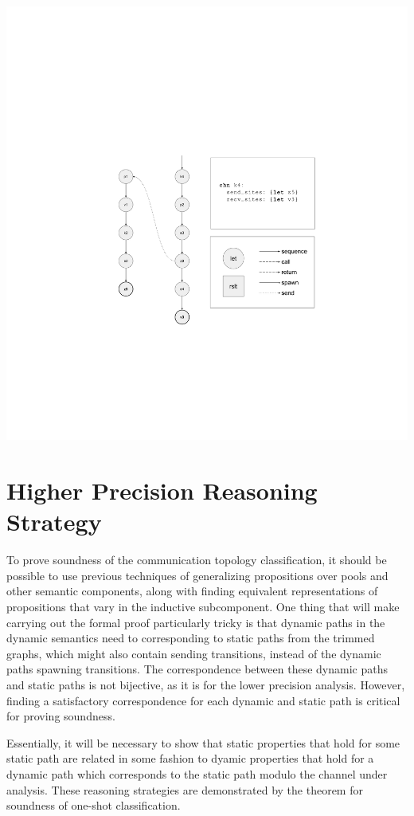 \documentclass[10pt]{article}
\begin{document}
\includegraphics[width=1.3\textwidth, left]{cml_graph_k4.pdf}

\section{Higher Precision Reasoning Strategy}
To prove soundness of the communication topology classification, it should be possible to use
previous techniques of generalizing propositions over pools and other semantic components,
along with finding equivalent representations of propositions that vary in the inductive
subcomponent. One thing that will make carrying out the formal proof particularly tricky is
that dynamic paths in the dynamic semantics need to corresponding to static paths from
the trimmed graphs, which might also contain sending transitions,
instead of the dynamic paths spawning transitions.
The correspondence between these dynamic paths and static paths
is not bijective, as it is for the lower precision analysis. However, finding a satisfactory
correspondence for each dynamic and static path is critical for proving soundness.

Essentially, it will be necessary to show that static
properties that hold for some static path are related in some fashion to dyamic properties
that hold for a dynamic path which corresponds to the static path modulo the channel under
analysis. These reasoning strategies are demonstrated by the theorem for soundness of
one-shot classification.
\end{document}
